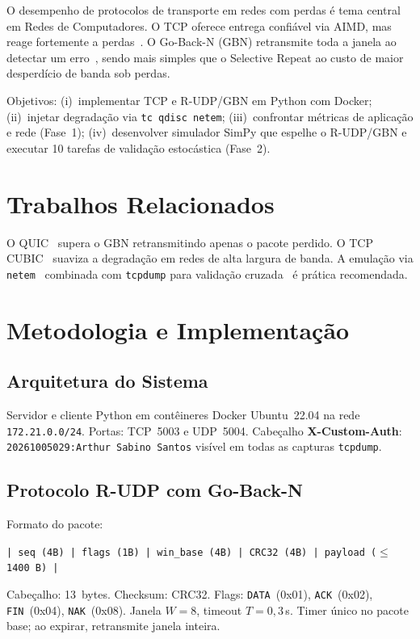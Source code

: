 \documentclass[12pt]{article}
\begin{document}
O desempenho de protocolos de transporte em redes com perdas é tema central em Redes
de Computadores. O TCP oferece entrega confiável via AIMD, mas reage fortemente a
perdas~\cite{kurose2017}. O Go-Back-N (GBN) retransmite toda a janela ao detectar
um erro~\cite{tanenbaum2011}, sendo mais simples que o Selective Repeat ao custo de
maior desperdício de banda sob perdas.

Objetivos: (i)~implementar TCP e R-UDP/GBN em Python com Docker; (ii)~injetar
degradação via \texttt{tc qdisc netem}; (iii)~confrontar métricas de aplicação e
rede (Fase~1); (iv)~desenvolver simulador SimPy que espelhe o R-UDP/GBN e executar
10 tarefas de validação estocástica (Fase~2).

\section{Trabalhos Relacionados}

O QUIC~\cite{iyengar2021} supera o GBN retransmitindo apenas o pacote perdido.
O TCP CUBIC~\cite{ha2008} suaviza a degradação em redes de alta largura de banda.
A emulação via \texttt{netem}~\cite{hemminger2005} combinada com \texttt{tcpdump}
para validação cruzada~\cite{paxson1997} é prática recomendada.

\section{Metodologia e Implementação}

\subsection{Arquitetura do Sistema}

Servidor e cliente Python em contêineres Docker Ubuntu~22.04 na rede
\texttt{172.21.0.0/24}. Portas: TCP~5003 e UDP~5004. Cabeçalho
\textbf{X-Custom-Auth}: \texttt{20261005029:Arthur Sabino Santos} visível em
todas as capturas \texttt{tcpdump}.

\subsection{Protocolo R-UDP com Go-Back-N}

Formato do pacote:
\begin{center}
\texttt{| seq (4B) | flags (1B) | win\_base (4B) | CRC32 (4B) | payload ($\leq$1400\,B) |}
\end{center}

Cabeçalho: 13~bytes. Checksum: CRC32. Flags: \texttt{DATA}~(0x01),
\texttt{ACK}~(0x02), \texttt{FIN}~(0x04), \texttt{NAK}~(0x08).
Janela $W=8$, timeout $T=0{,}3$\,s. Timer único no pacote base; ao expirar,
retransmite janela inteira.
\end{document}
